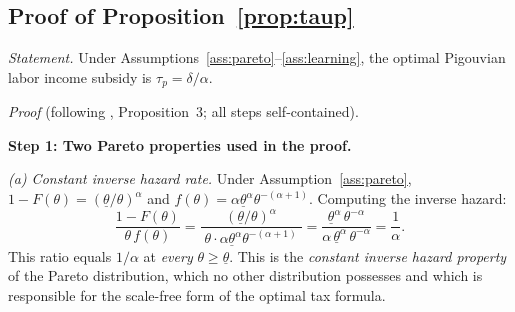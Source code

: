 \documentclass[12pt]{article}
\theoremstyle{definition}
\theoremstyle{remark}
\begin{document}
\subsection*{Proof of Proposition~\ref{prop:taup}}

\noindent \textit{Statement.} Under Assumptions~\ref{ass:pareto}--\ref{ass:learning},
the optimal Pigouvian labor income subsidy is $\tau_p = \delta / \alpha$.

\medskip
\noindent \textit{Proof} (following \citealt{sztutman2024}, Proposition~3; all steps
self-contained).

\medskip
\noindent \textbf{Step 1: Two Pareto properties used in the proof.}

\noindent\textit{(a) Constant inverse hazard rate.} Under Assumption~\ref{ass:pareto},
$1-F(\theta) = (\underline{\theta}/\theta)^\alpha$ and $f(\theta) = \alpha
\underline{\theta}^\alpha \theta^{-(\alpha+1)}$. Computing the inverse hazard:
\begin{equation}
\label{eq:pareto_hazard}
\frac{1-F(\theta)}{\theta\,f(\theta)}
= \frac{(\underline{\theta}/\theta)^\alpha}{\;\theta \cdot \alpha\underline{\theta}^\alpha
  \theta^{-(\alpha+1)}\;}
= \frac{\underline{\theta}^\alpha\,\theta^{-\alpha}}{\alpha\,\underline{\theta}^\alpha\,
  \theta^{-\alpha}}
= \frac{1}{\alpha}.
\end{equation}
This ratio equals $1/\alpha$ at \emph{every} $\theta \geq \underline{\theta}$. This is the
\emph{constant inverse hazard property} of the Pareto distribution, which no other distribution
possesses and which is responsible for the scale-free form of the optimal tax formula.
\end{document}
